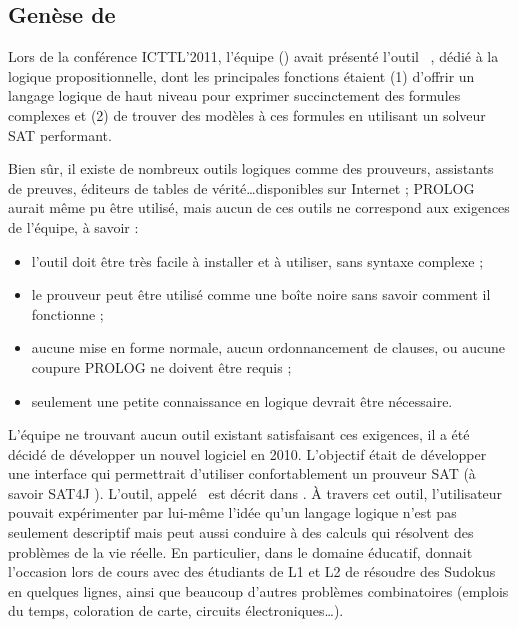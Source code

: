 \subsection{Genèse de \satoulouse}

Lors de la conférence ICTTL'2011, l'équipe (\citeauthor{GaScSt2011}) avait présenté l'outil \satoulouse\ \cite{GaScSt2011}, dédié à la logique propositionnelle, dont les principales fonctions étaient (1) d'offrir un langage logique de haut niveau pour exprimer succinctement des formules complexes et (2) de trouver des modèles à ces formules en utilisant un solveur SAT performant.

Bien sûr, il existe de nombreux outils logiques comme des prouveurs, assistants de preuves, éditeurs de tables de vérité\ldots disponibles sur Internet ; PROLOG aurait même pu être utilisé, mais aucun de ces outils ne correspond aux exigences de l'équipe, à savoir :
\begin{itemize}
\item l'outil doit être très facile à installer et à utiliser, sans syntaxe complexe ;
\item le prouveur peut être utilisé comme une boîte noire sans savoir comment il fonctionne ;
\item  aucune mise en forme normale,  aucun ordonnancement de clauses, ou aucune coupure PROLOG ne doivent être requis ;
\item seulement une petite connaissance en logique devrait être nécessaire.
\end{itemize} 

L'équipe ne trouvant aucun outil existant satisfaisant ces exigences, il a été décidé de développer un nouvel logiciel en 2010. L'objectif était de développer une interface qui permettrait d'utiliser confortablement un prouveur SAT (à savoir SAT4J \cite{DBLP:journals/jsat/BerreP10}). L'outil, appelé \satoulouse\, est décrit dans \cite{GaScSt2011}. À travers cet outil, l'utilisateur pouvait expérimenter par lui-même l'idée qu'un langage logique n'est pas seulement descriptif mais peut aussi conduire à des calculs qui résolvent des problèmes de la vie réelle. En particulier, dans le domaine éducatif, \satoulouse donnait l'occasion lors de cours avec des étudiants de L1 et L2 de résoudre des Sudokus en quelques lignes, ainsi que beaucoup d'autres problèmes combinatoires (emplois du temps, coloration de carte, circuits électroniques\ldots).\

